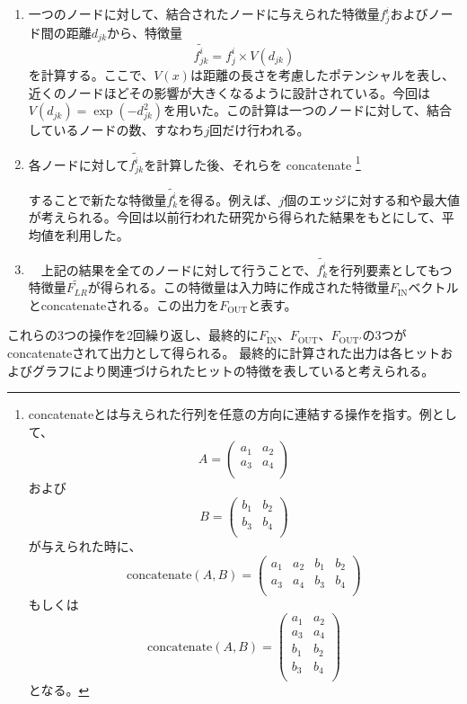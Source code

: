 \begin{enumerate}
\item  一つのノードに対して、結合されたノードに与えられた特徴量$f^{i}_{j}$およびノード間の距離$d_{jk}$から、特徴量
\begin{equation}
\tilde{f_{jk}^i} = f^i_j \times V(d_{jk})
\end{equation}
を計算する。ここで、$V(x)$は距離の長さを考慮したポテンシャルを表し、近くのノードほどその影響が大きくなるように設計されている。今回は$V(d_{jk})=\exp(-d_{jk}^2)$を用いた。この計算は一つのノードに対して、結合しているノードの数、すなわち$j$回だけ行われる。

\item 各ノードに対して$\tilde{f_{jk}^i}$を計算した後、それらを concatenate
\footnote{concatenateとは与えられた行列を任意の方向に連結する操作を指す。例として、
\[
A = \begin{pmatrix}
a_1&a_2\\
a_3&a_4\\
\end{pmatrix}
\]
および
\[
B=\begin{pmatrix}
b_1&b_2\\
b_3&b_4\\
\end{pmatrix}
\]
が与えられた時に、
\[
\mathrm{concatenate}(A, B)= 
\begin{pmatrix}
a_1&a_2&b_1&b_2\\
a_3&a_4&b_3&b_4\\
\end{pmatrix}
\]
もしくは
\[
\mathrm{concatenate}(A, B)= 
\begin{pmatrix}
a_1&a_2\\
a_3&a_4\\
b_1&b_2\\
b_3&b_4\\
\end{pmatrix}
\]
となる。
}

することで新たな特徴量$\tilde{f_k^i}$を得る。例えば、$j$個のエッジに対する和や最大値が考えられる。今回は以前行われた研究から得られた結果をもとにして、平均値を利用した。

\item 　上記の結果を全てのノードに対して行うことで、$\tilde{f_{k}^i}$を行列要素としてもつ特徴量$\tilde{F_{LR}}$が得られる。この特徴量は入力時に作成された特徴量$F_{\mathrm{IN}}$ベクトルとconcatenateされる。この出力を$F_{\mathrm{OUT}}$と表す。
\end{enumerate}

これらの3つの操作を2回繰り返し、最終的に$F_{\mathrm{IN}}$、$F_{\mathrm{OUT}}$、$F_{\mathrm{OUT}'}$の3つがconcatenateされて出力として得られる。
最終的に計算された出力は各ヒットおよびグラフにより関連づけられたヒットの特徴を表していると考えられる。

